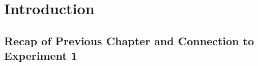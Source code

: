 




\section{Introduction}\label{sec:exp2_intro}

\subsection{Recap of Previous Chapter and Connection to Experiment 1}

